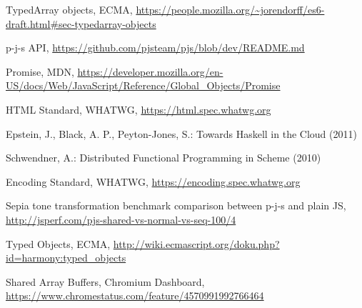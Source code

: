 \documentclass[runningheads,a4paper]{llncs}
\begin{document}
\begin{thebibliography}{4}
 TypedArray objects, ECMA, \url{https://people.mozilla.org/~jorendorff/es6-draft.html#sec-typedarray-objects}

 p-j-s API, \url{https://github.com/pjsteam/pjs/blob/dev/README.md}

 Promise, MDN, \url{https://developer.mozilla.org/en-US/docs/Web/JavaScript/Reference/Global_Objects/Promise}

 HTML Standard, WHATWG, \url{https://html.spec.whatwg.org}

 Epstein, J., Black, A. P., Peyton-Jones, S.: Towards Haskell in the Cloud (2011)

 Schwendner, A.: Distributed Functional Programming in Scheme (2010)

 Encoding Standard, WHATWG, \url{https://encoding.spec.whatwg.org}

 Sepia tone transformation benchmark comparison between p-j-s and plain JS, \url{http://jsperf.com/pjs-shared-vs-normal-vs-seq-100/4}

 Typed Objects, ECMA, \url{http://wiki.ecmascript.org/doku.php?id=harmony:typed_objects}

 Shared Array Buffers, Chromium Dashboard, \url{https://www.chromestatus.com/feature/4570991992766464}

\end{thebibliography}
\end{document}
